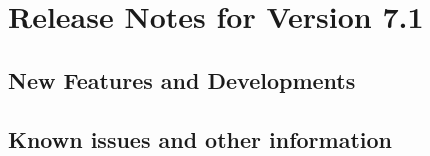 
\section{Release Notes for Version 7.1}


\subsection{New Features and Developments}


\subsection{Known issues and other information}

